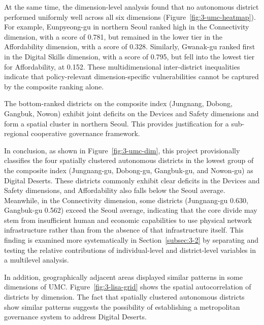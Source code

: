 At the same time, the dimension-level analysis found that no autonomous district performed uniformly well across all six dimensions (Figure~\ref{fig:3-umc-heatmap}). For example, Eunpyeong-gu in northern Seoul ranked high in the Connectivity dimension, with a score of 0.781, but remained in the lower tier in the Affordability dimension, with a score of 0.328. Similarly, Gwanak-gu ranked first in the Digital Skills dimension, with a score of 0.795, but fell into the lowest tier for Affordability, at 0.152. These multidimensional inter-district inequalities indicate that policy-relevant dimension-specific vulnerabilities cannot be captured by the composite ranking alone.

\begin{keymsg}[title=Key Finding \textperiodcentered{} Four Digital Desert Districts]
The bottom-ranked districts on the composite index (Jungnang, Dobong, Gangbuk, Nowon) exhibit joint deficits on the Devices and Safety dimensions and form a spatial cluster in northern Seoul. This provides justification for a sub-regional cooperative governance framework.
\end{keymsg}

In conclusion, as shown in Figure~\ref{fig:3-umc-dim}, this project provisionally classifies the four spatially clustered autonomous districts in the lowest group of the composite index (Jungnang-gu, Dobong-gu, Gangbuk-gu, and Nowon-gu) as Digital Deserts. These districts commonly exhibit clear deficits in the Devices and Safety dimensions, and Affordability also falls below the Seoul average. Meanwhile, in the Connectivity dimension, some districts (Jungnang-gu 0.630, Gangbuk-gu 0.562) exceed the Seoul average, indicating that the core divide may stem from insufficient human and economic capabilities to use physical network infrastructure rather than from the absence of that infrastructure itself. This finding is examined more systematically in Section~\ref{subsec:3-2} by separating and testing the relative contributions of individual-level and district-level variables in a multilevel analysis.

In addition, geographically adjacent areas displayed similar patterns in some dimensions of UMC. Figure~\ref{fig:3-lisa-grid} shows the spatial autocorrelation of districts by dimension. The fact that spatially clustered autonomous districts show similar patterns suggests the possibility of establishing a metropolitan governance system to address Digital Deserts.

